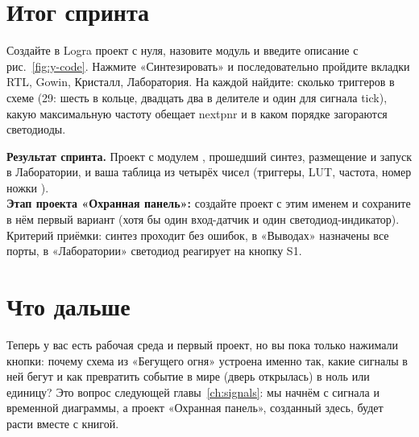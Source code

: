 \section{Итог спринта}

\begin{taskbox}[Задание]
Создайте в Logra проект с нуля, назовите модуль  и введите
описание с рис.~\ref{fig:y-code}. Нажмите «Синтезировать» и последовательно
пройдите вкладки RTL, Gowin, Кристалл, Лаборатория. На каждой найдите:
сколько триггеров в схеме (29: шесть в кольце, двадцать два в делителе и один для сигнала tick),
какую максимальную частоту обещает nextpnr и в каком порядке загораются
светодиоды.
\end{taskbox}

\begin{diybox}
\textbf{Результат спринта.} Проект с модулем , прошедший синтез,
размещение и запуск в Лаборатории, и ваша таблица из четырёх чисел
(триггеры, LUT, частота, номер ножки ).\\
 \textbf{Этап проекта «Охранная панель»:} создайте проект с этим
именем и сохраните в нём первый вариант (хотя бы один вход-датчик и один
светодиод-индикатор). Критерий приёмки: синтез проходит без ошибок, в
«Выводах» назначены все порты, в «Лаборатории» светодиод реагирует на кнопку S1.
\end{diybox}

\section{Что дальше}

Теперь у вас есть рабочая среда и первый проект, но вы пока только нажимали
кнопки: почему схема из «Бегущего огня» устроена именно так, какие сигналы в ней
бегут и как превратить событие в мире (дверь открылась) в ноль или единицу? Это
вопрос следующей главы~\ref{ch:signals}: мы начнём с сигнала и временной
диаграммы, а проект «Охранная панель», созданный здесь, будет расти вместе с
книгой.
